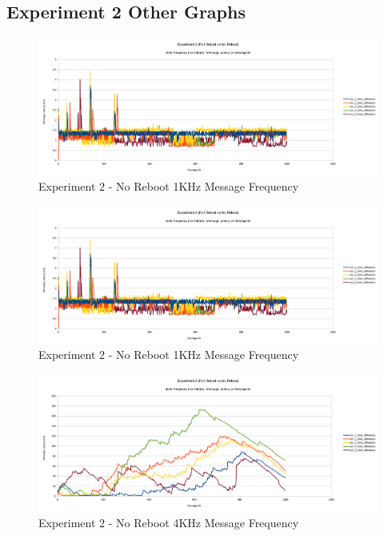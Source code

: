 \documentclass{l4proj}
\begin{document}
\begin{appendices}

\chapter{Experiment 2 Other Graphs}
\label{exp2-appendix-results}

\begin{figure}
\centering
\includegraphics[width=\textwidth]{images/no-reboot-1khz.png}
\caption{Experiment 2 - No Reboot 1KHz Message Frequency}
\label{exp2-noreboot-1khz}
\end{figure}

\begin{figure}
\centering
\includegraphics[width=\textwidth]{images/no-reboot-1khz.png}
\caption{Experiment 2 - No Reboot 1KHz Message Frequency}
\label{exp2-fullreboot-1khz}
\end{figure}

\begin{figure}
\centering
\includegraphics[width=\textwidth]{images/no-reboot-4khz.png}
\caption{Experiment 2 - No Reboot 4KHz Message Frequency}
\label{exp2-noreboot-4khz}
\end{figure}


\end{appendices}
\end{document}
